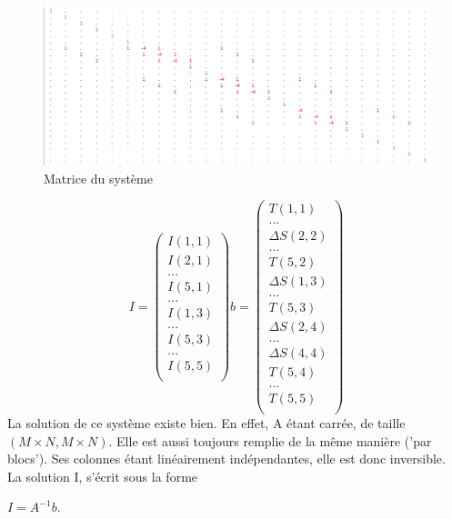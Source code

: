 \begin{figure}[!htb]
\includegraphics[scale=0.5]{Images/matrice.png}
\caption{Matrice du système}
\end{figure}
\begin{equation}
I = 
\begin{pmatrix}
I(1,1)\\
I(2,1)\\
...\\
I(5,1)\\
...\\
I(1,3)\\
...\\
I(5,3)\\
...\\
I(5,5)\\
\end{pmatrix}
b = 
\begin{pmatrix}
T(1,1)\\
...\\
\Delta S(2,2)\\
...\\
T(5,2)\\
\Delta S(1,3)\\
...\\
T(5,3)\\
\Delta S(2,4)\\
...\\
\Delta S(4,4)\\
T(5,4)\\
...\\
T(5,5)\\
\end{pmatrix}
\end{equation}
La solution de ce système existe bien. En effet, A étant carrée, de taille $\left(M\times N, M \times N\right)$. Elle est aussi toujours remplie de la même manière ('par blocs'). Ses colonnes étant linéairement indépendantes, elle est donc inversible.\\
La solution I, s'écrit sous la forme
\begin{center}
$I = A^{-1}b$.
\end{center} 
